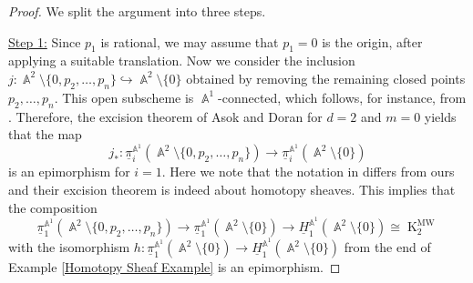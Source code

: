\documentclass[english]{amsart}
\theoremstyle{definition}
\DeclareMathOperator{\A}{\mathbb{A}}
\DeclareMathOperator{\K}{K}
\DeclareMathOperator{\MW}{MW}
\begin{document}
\begin{proof}
We split the argument into three steps.

\underline {Step 1:} Since $p_1$ is rational, we may assume that $p_1=0$ is the origin, after applying a suitable translation. Now we consider the inclusion $j \colon \A^2 \setminus \{ 0,p_2,\dots,p_n \} \hookrightarrow \A^2 \setminus \{ 0 \}$ obtained by removing the remaining closed points $p_2,\dots,p_n$. This open subscheme is $\A^1$-connected, which follows, for instance, from \cite[Remark~2.16]{asok:doran:excision}. Therefore, the excision theorem of Asok and Doran \cite[Theorem~4.1]{asok:doran:excision} for $d=2$ and $m=0$ yields that the map
\[
j_*\colon \underline{\pi}_i^{\A^1}(\A^2 \setminus \{ 0,p_2,\dots,p_n \}) \to \underline{\pi}_i^{\A^1}(\A^2 \setminus \{ 0 \})
\]
is an epimorphism for $i=1$. Here we note that the notation in \cite{asok:doran:excision} differs from ours and their excision theorem is indeed about homotopy sheaves. This implies that the composition 
\[
\underline{\pi}_1^{\A^1}(\A^2 \setminus \{ 0,p_2,\dots,p_n \}) \to \underline{\pi}_1^{\A^1}(\A^2 \setminus \{ 0 \}) \to \underline{H}_1^{\A^1}(\A^2 \setminus \{ 0 \})\cong\K^{\MW}_2
\]
with the isomorphism $h \colon \underline{\pi}_1^{\A^1}(\A^2 \setminus \{ 0 \})\to\underline{H}_1^{\A^1}(\A^2 \setminus \{ 0 \})$ from the end of Example \ref{Homotopy Sheaf Example} is an epimorphism.


\end{proof}
\end{document}

